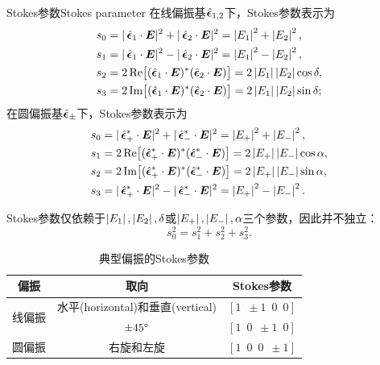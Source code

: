 \begin{definition}
    {Stokes参数}{Stokes parameter}
    在线偏振基$\mathop{}\!\hat{\bm{\epsilon}}_{1,2}$下，Stokes参数表示为
    \begin{subequations}
        \begin{align}
            s_0&=|\uvec\epsilon_1\cdot\bm E|^2+|\uvec\epsilon_2\cdot\bm E|^2=\abs{E_1}^2+\abs{E_2}^2,\\
            s_1&=|\uvec\epsilon_1\cdot\bm E|^2-|\uvec\epsilon_2\cdot\bm E|^2=\abs{E_1}^2-\abs{E_2}^2,\\
            s_2&=2\Re\bigfkh{(\uvec\epsilon_1\cdot\bm E)\cj(\uvec\epsilon_2\cdot\bm E)}=2\abs{E_1}\abs{E_2}\cos\delta,\\
            s_3&=2\Im\bigfkh{(\uvec\epsilon_1\cdot\bm E)\cj(\uvec\epsilon_2\cdot\bm E)}=2\abs{E_1}\abs{E_2}\sin\delta;
        \end{align}
    \end{subequations}
    在圆偏振基$\mathop{}\!\hat{\bm{\epsilon}}_\pm$下，Stokes参数表示为
    \begin{subequations}
        \begin{align}
            s_0&=|\uvec\epsilon_+\cj\cdot\bm E|^2+|\uvec\epsilon_-\cj\cdot\bm E|^2=\abs{E_+}^2+\abs{E_-}^2,\\
            s_1&=2\Re\bigfkh{(\uvec\epsilon_+\cj\cdot\bm E)\cj(\uvec\epsilon_-\cj\cdot\bm E)}=2\abs{E_+}\abs{E_-}\cos\alpha,\\
            s_2&=2\Im\bigfkh{(\uvec\epsilon_+\cj\cdot\bm E)\cj(\uvec\epsilon_-\cj\cdot\bm E)}=2\abs{E_+}\abs{E_-}\sin\alpha,\\
            s_3&=|\uvec\epsilon_+\cj\cdot\bm E|^2-|\uvec\epsilon_-\cj\cdot\bm E|^2=\abs{E_+}^2-\abs{E_-}^2.
        \end{align}
    \end{subequations}
\end{definition}
\begin{corollary}
    Stokes参数仅依赖于$\left\lvert E_1\right\rvert,\left\lvert E_2\right\rvert,\delta$或$\left\lvert E_+\right\rvert,\left\lvert E_-\right\rvert,\alpha$三个参数，因此并不独立：
    \[
        s_0^2=s_1^2+s_2^2+s_3^2.
    \]
\end{corollary}

\begin{table}[h]
    \centering
    \caption{典型偏振的Stokes参数}
    \begin{tabular}{ccc}
        \toprule
        偏振 & 取向 & Stokes参数\\
        \midrule
        \multirow{2}{*}{线偏振} & 水平(horizontal)和垂直(vertical) & $[1\enspace\pm1\enspace0\enspace0]$ \\
         & $\pm 45^\circ$ & $[1\enspace0\enspace\pm1\enspace0]$ \\
        圆偏振 & 右旋和左旋 & $[1\enspace0\enspace0\enspace\pm1]$ \\
        \bottomrule
    \end{tabular}
    \label{tab:Stokes parameters}
\end{table}

